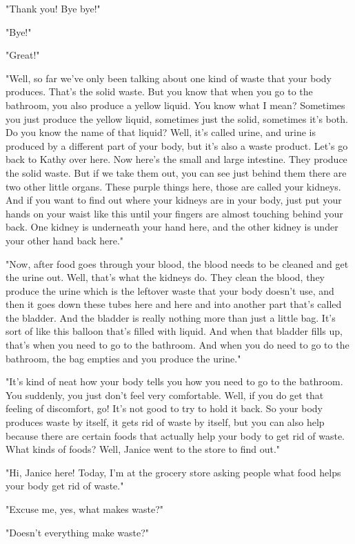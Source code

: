 "Thank you! Bye bye!"

"Bye!"

"Great!"

"Well, so far we've only been talking about one kind of waste that your body produces. That's the solid waste. But you know that when you go to the bathroom, you also produce a yellow liquid. You know what I mean? Sometimes you just produce the yellow liquid, sometimes just the solid, sometimes it's both. Do you know the name of that liquid? Well, it's called urine, and urine is produced by a different part of your body, but it's also a waste product. Let's go back to Kathy over here. Now here's the small and large intestine. They produce the solid waste. But if we take them out, you can see just behind them there are two other little organs. These purple things here, those are called your kidneys. And if you want to find out where your kidneys are in your body, just put your hands on your waist like this until your fingers are almost touching behind your back. One kidney is underneath your hand here, and the other kidney is under your other hand back here."

"Now, after food goes through your blood, the blood needs to be cleaned and get the urine out. Well, that's what the kidneys do. They clean the blood, they produce the urine which is the leftover waste that your body doesn't use, and then it goes down these tubes here and here and into another part that's called the bladder. And the bladder is really nothing more than just a little bag. It's sort of like this balloon that's filled with liquid. And when that bladder fills up, that's when you need to go to the bathroom. And when you do need to go to the bathroom, the bag empties and you produce the urine."

"It's kind of neat how your body tells you how you need to go to the bathroom. You suddenly, you just don't feel very comfortable. Well, if you do get that feeling of discomfort, go! It's not good to try to hold it back. So your body produces waste by itself, it gets rid of waste by itself, but you can also help because there are certain foods that actually help your body to get rid of waste. What kinds of foods? Well, Janice went to the store to find out."

"Hi, Janice here! Today, I'm at the grocery store asking people what food helps your body get rid of waste."

"Excuse me, yes, what makes waste?"

"Doesn't everything make waste?"

